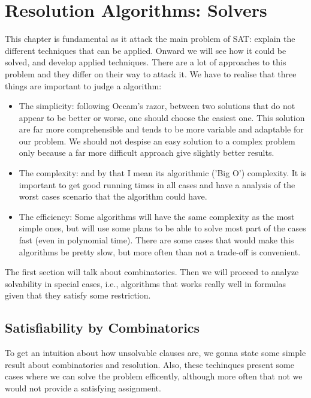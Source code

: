 
\chapter{Resolution Algorithms: Solvers}

This chapter is fundamental as it attack the main problem of SAT: explain the different techniques that can be applied. Onward we will see how it could be solved, and develop applied techniques. There are a lot of approaches to this problem and they differ on their way to attack it. We have to realise that three things are important to judge a algorithm:

\begin{itemize}
\item The simplicity: following Occam's razor, between two solutions that do not appear to be better or worse, one should choose the easiest one. This solution are far more comprehensible and tends to be more variable and adaptable for our problem. We should not despise an easy solution to a complex problem only because a far more difficult approach give slightly better results.

\item The complexity: and by that I mean its algorithmic ('Big O') complexity. It is important to get good running times in all cases and have a analysis of the worst cases scenario that the algorithm could have.

\item The efficiency: Some algorithms will have the same complexity as the most simple ones, but will use some plans to be able to solve most part of the cases fast (even in polynomial time). There are some cases that would make this algorithms be pretty slow, but more often than not a trade-off is convenient.
\end{itemize}
  
  The first section will talk about combinatorics. Then we will proceed to analyze solvability in special cases, i.e., algorithms  that works really well in formulas given that they satisfy some restriction.

\section{Satisfiability by Combinatorics}


To get an intuition about how unsolvable clauses are, we gonna state some simple result about combinatorics and resolution. Also, these techinques present some cases where we can solve the problem efficently, although more often that not we would not provide a satisfying assignment.



